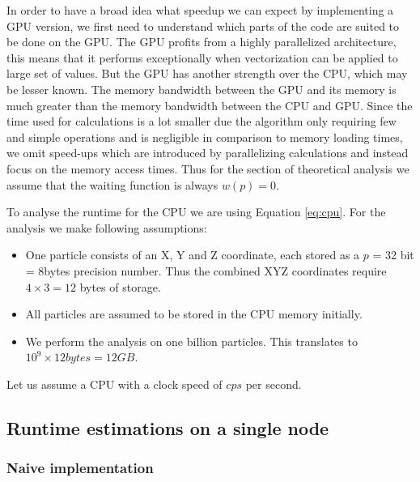 \documentclass[]{article}
\begin{document}
In order to have a broad idea what speedup we can expect by implementing a GPU version, we first need to understand which parts of the code are suited to be done on the GPU. The GPU profits from a highly parallelized architecture, this means that it performs exceptionally when vectorization can be applied to large set of values. But the GPU has another strength over the CPU, which may be lesser known. The memory bandwidth between the GPU and its memory is much greater than the memory bandwidth between the CPU and GPU. Since the time used for calculations is a lot smaller due the algorithm only requiring few and simple operations and is negligible in comparison to memory loading times, we omit speed-ups which are introduced by parallelizing calculations and instead focus on the memory access times. Thus for the section of theoretical analysis we assume that the waiting function is always $w(p) = 0$.

To analyse the runtime for the CPU we are using Equation \ref{eq:cpu}. For the analysis we make following assumptions:

\begin{itemize}
	\item
	One particle consists of an X, Y and Z coordinate, each stored as a $p$ = 32 bit = 8bytes precision number. Thus the combined  XYZ coordinates require $4\times3 = 12$ bytes of storage.
	
	\item 
	All particles are assumed to be stored in the CPU memory initially.
	
	\item
	We perform the analysis on one billion particles. This translates to $10^9 \times  12 bytes = 12 GB$.
	
\end{itemize}


Let us assume a CPU with a clock speed of $cps$ per second. 

\subsection{Runtime estimations on a single node}


\subsubsection{Naive implementation}
\end{document}
